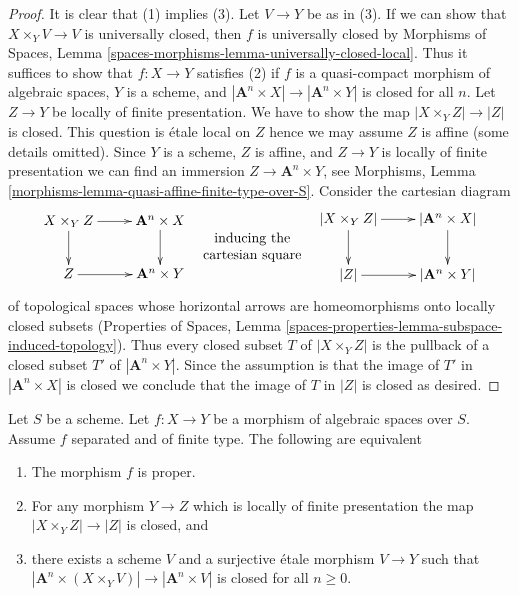 \begin{proof}
\medskip\noindent
It is clear that (1) implies (3). Let $V \to Y$ be as in (3).
If we can show that $X \times_Y V \to V$ is universally closed,
then $f$ is universally closed by
Morphisms of Spaces, Lemma
\ref{spaces-morphisms-lemma-universally-closed-local}.
Thus it suffices to show that $f : X \to Y$ satisfies (2)
if $f$ is a quasi-compact morphism of algebraic spaces,
$Y$ is a scheme, and $|\mathbf{A}^n \times X| \to |\mathbf{A}^n \times Y|$
is closed for all $n$. Let $Z \to Y$ be locally of finite presentation.
We have to show the map $|X \times_Y Z| \to |Z|$ is closed.
This question is \'etale local on $Z$ hence we may assume $Z$
is affine (some details omitted). Since $Y$ is a scheme, $Z$ is affine,
and $Z \to Y$ is locally of finite presentation we can find
an immersion $Z \to \mathbf{A}^n \times Y$, see
Morphisms, Lemma \ref{morphisms-lemma-quasi-affine-finite-type-over-S}.
Consider the cartesian diagram
$$
\vcenter{
\xymatrix{
X \times_Y Z \ar[d] \ar[r] & \mathbf{A}^n \times X \ar[d] \\
Z \ar[r] & \mathbf{A}^n \times Y
}
}
\quad
\begin{matrix}
\text{inducing the} \\
\text{cartesian square}
\end{matrix}
\quad
\vcenter{
\xymatrix{
|X \times_Y Z| \ar[d] \ar[r] & |\mathbf{A}^n \times X| \ar[d] \\
|Z| \ar[r] & |\mathbf{A}^n \times Y|
}
}
$$
of topological spaces whose horizontal arrows are homeomorphisms
onto locally closed subsets (Properties of Spaces, Lemma
\ref{spaces-properties-lemma-subspace-induced-topology}).
Thus every closed subset $T$
of $|X \times_Y Z|$ is the pullback of a closed subset $T'$ of
$|\mathbf{A}^n \times Y|$. Since the assumption is that the image
of $T'$ in $|\mathbf{A}^n \times X|$ is closed we conclude that
the image of $T$ in $|Z|$ is closed as desired.
\end{proof}

\begin{lemma}
\label{lemma-limited-base-change}
Let $S$ be a scheme. Let $f : X \to Y$ be a
morphism of algebraic spaces over $S$.
Assume $f$ separated and of finite type.
The following are equivalent
\begin{enumerate}
\item The morphism $f$ is proper.
\item For any morphism $Y \to Z$ which is locally of finite presentation
the map $|X \times_Y Z| \to |Z|$ is closed, and
\item there exists a scheme $V$ and a surjective \'etale morphism $V \to Y$
such that $|\mathbf{A}^n \times (X \times_Y V)| \to |\mathbf{A}^n \times V|$
is closed for all $n \geq 0$.
\end{enumerate}
\end{lemma}

